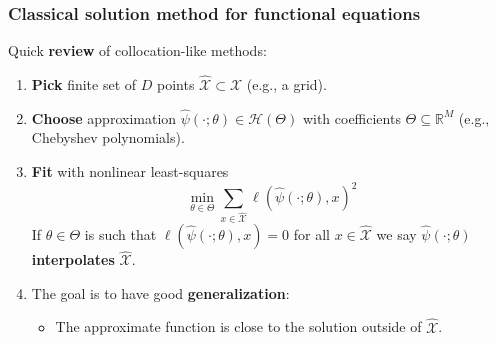 \documentclass[aspectratio=169,10pt]{beamer}
\newcommand{\emphcolor}[1]{\textbf{\textcolor{emphcolorval}{#1}}}
\newcommand{\R}{\ensuremath{\mathbb{R}}}
\newcommand{\Xdom}{\mathcal{X}}
\newcommand{\Xtrain}{\hat{\mathcal{X}}}
\begin{document}
\begin{frame}
	\frametitle{Classical solution method for functional equations}
	
	Quick \emphcolor{review} of collocation-like methods:
	
	\begin{enumerate}
		\item \emphcolor{Pick} finite set of $D$ points $\Xtrain \subset \Xdom$ (e.g., a grid).
		\smallskip
		\item \emphcolor{Choose} approximation $\hat{\psi}(\cdot;\theta) \in \mathcal{H}(\Theta)$ with coefficients $\Theta \subseteq \R^M$ (e.g., Chebyshev polynomials).
		\smallskip
		\item \emphcolor{Fit} with nonlinear least-squares 
		$$
		\min_{\theta \in \Theta} \sum_{x \in \Xtrain} \ell(\hat{\psi}(\cdot;\theta),x)^2
		$$
		\smallskip
		If $\theta \in \Theta$ is such that $\ell(\hat{\psi}(\cdot;\theta),x) = 0$ for all $x \in \Xtrain$ we say $\hat{\psi}(\cdot;\theta)$ \emphcolor{interpolates} $\Xtrain$.
		\smallskip
		\item The goal is to have good \emphcolor{generalization}:
		\begin{itemize}\smallskip
			\item The approximate function is close to the solution outside of $\Xtrain$.\smallskip
		\end{itemize}
	\end{enumerate}
\end{frame}
\end{document}
